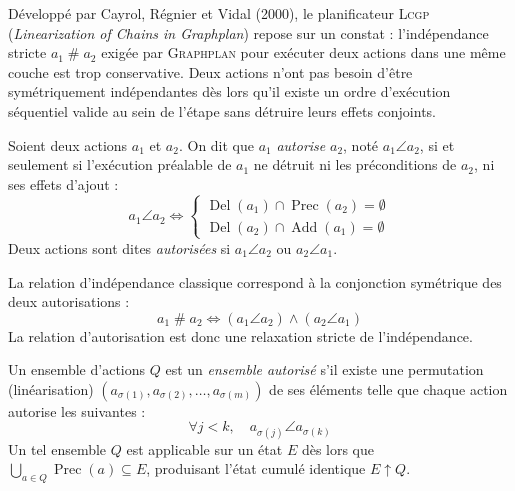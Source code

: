 Développé par Cayrol, Régnier et Vidal (2000), le planificateur \textsc{Lcgp} (\emph{Linearization of Chains in Graphplan}) repose sur un constat : l'indépendance stricte $a_1 \mathrel{\#} a_2$ exigée par \textsc{Graphplan} pour exécuter deux actions dans une même couche est trop conservative. Deux actions n'ont pas besoin d'être symétriquement indépendantes dès lors qu'il existe un ordre d'exécution séquentiel valide au sein de l'étape sans détruire leurs effets conjoints.

\begin{definition}
    Soient deux actions $a_1$ et $a_2$. On dit que $a_1$ \emph{autorise} $a_2$, noté $a_1 \angle a_2$, si et seulement si l'exécution préalable de $a_1$ ne détruit ni les préconditions de $a_2$, ni ses effets d'ajout :
    \begin{equation}
        a_1 \angle a_2 \iff 
        \begin{cases}
            \operatorname{Del}(a_1) \cap \operatorname{Prec}(a_2) = \emptyset \\
            \operatorname{Del}(a_2) \cap \operatorname{Add}(a_1) = \emptyset
        \end{cases}
    \end{equation}
    Deux actions sont dites \emph{autorisées} si $a_1 \angle a_2$ ou $a_2 \angle a_1$.
\end{definition}

\begin{remark}
    La relation d'indépendance classique correspond à la conjonction symétrique des deux autorisations :
    \begin{equation}
        a_1 \mathrel{\#} a_2 \iff (a_1 \angle a_2) \land (a_2 \angle a_1)
    \end{equation}
    La relation d'autorisation est donc une relaxation stricte de l'indépendance.
\end{remark}

\begin{definition}
    Un ensemble d'actions $Q$ est un \emph{ensemble autorisé} s'il existe une permutation (linéarisation) $(a_{\sigma(1)}, a_{\sigma(2)}, \dots, a_{\sigma(m)})$ de ses éléments telle que chaque action autorise les suivantes :
    \begin{equation}
        \forall j < k, \quad a_{\sigma(j)} \angle a_{\sigma(k)}
    \end{equation}
    Un tel ensemble $Q$ est applicable sur un état $E$ dès lors que $\bigcup_{a \in Q} \operatorname{Prec}(a) \subseteq E$, produisant l'état cumulé identique $E \uparrow Q$.
\end{definition}

